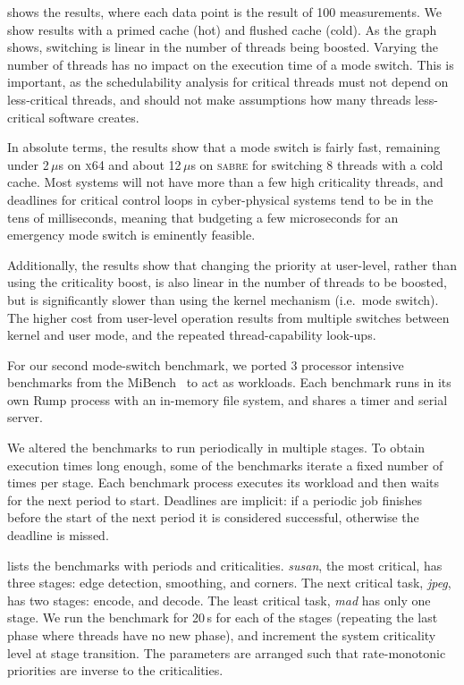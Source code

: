  shows the results, where each data point is the result of 100 measurements.
We show results with a primed cache (hot) and flushed cache (cold).
As the graph shows, switching is linear in the number of  threads being boosted. Varying the number
of  threads has no impact on the execution time of a mode switch.
This is important, as the schedulability analysis for critical threads
must not depend on less-critical threads, and should not make
assumptions how many threads less-critical software creates.

In absolute terms, the results show that a mode switch is fairly fast,
remaining under 2\,$\mu$s on \textsc{x64} and about 12\,\(\mu\)s on \textsc{sabre} for switching 8 threads
with a cold cache. Most systems will not have more than a few high
criticality threads, and deadlines for critical control loops in
cyber-physical systems tend to be in the tens of milliseconds, meaning
that budgeting a few microseconds for an emergency mode switch is eminently
feasible.

Additionally, the results show that changing the priority at user-level, rather than using the
criticality boost, is also linear in the number of threads to be boosted, but  is significantly slower than using the kernel mechanism (i.e.\ mode switch).
The higher cost from user-level operation results from  multiple switches between kernel and user mode, and the repeated thread-capability look-ups.

For our second mode-switch benchmark, we ported 3 processor intensive benchmarks from the
MiBench~\citep{Guthaus_REAMB_01} to act as workloads. Each benchmark runs in its own Rump process
with an in-memory file system, and shares a timer and serial server.

We altered the benchmarks to run periodically in multiple stages. To obtain
execution times long enough, some of the benchmarks iterate a fixed number of times per
stage. Each benchmark process executes its workload and then waits for the next period to start.
Deadlines are implicit: if a periodic job finishes before the start of the next period it is
considered successful, otherwise the deadline is missed.

 lists the benchmarks with periods and criticalities.
\textit{susan}, the most critical, has three stages: edge detection, smoothing, and corners. The
next critical task, \textit{jpeg}, has two stages: encode, and decode. The least
critical task, \textit{mad} has only one stage. We run the benchmark
for 20\,s for each of the stages (repeating the last phase where
threads have no new phase), and
increment the system criticality level at stage transition. The parameters are arranged such that
rate-monotonic priorities are inverse to the criticalities.

